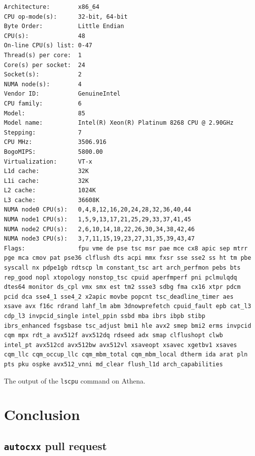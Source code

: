\begin{code}
    \begin{verbatim}
Architecture:        x86_64
CPU op-mode(s):      32-bit, 64-bit
Byte Order:          Little Endian
CPU(s):              48
On-line CPU(s) list: 0-47
Thread(s) per core:  1
Core(s) per socket:  24
Socket(s):           2
NUMA node(s):        4
Vendor ID:           GenuineIntel
CPU family:          6
Model:               85
Model name:          Intel(R) Xeon(R) Platinum 8268 CPU @ 2.90GHz
Stepping:            7
CPU MHz:             3506.916
BogoMIPS:            5800.00
Virtualization:      VT-x
L1d cache:           32K
L1i cache:           32K
L2 cache:            1024K
L3 cache:            36608K
NUMA node0 CPU(s):   0,4,8,12,16,20,24,28,32,36,40,44
NUMA node1 CPU(s):   1,5,9,13,17,21,25,29,33,37,41,45
NUMA node2 CPU(s):   2,6,10,14,18,22,26,30,34,38,42,46
NUMA node3 CPU(s):   3,7,11,15,19,23,27,31,35,39,43,47
Flags:               fpu vme de pse tsc msr pae mce cx8 apic sep mtrr pge mca cmov pat pse36 clflush dts acpi mmx fxsr sse sse2 ss ht tm pbe syscall nx pdpe1gb rdtscp lm constant_tsc art arch_perfmon pebs bts rep_good nopl xtopology nonstop_tsc cpuid aperfmperf pni pclmulqdq dtes64 monitor ds_cpl vmx smx est tm2 ssse3 sdbg fma cx16 xtpr pdcm pcid dca sse4_1 sse4_2 x2apic movbe popcnt tsc_deadline_timer aes xsave avx f16c rdrand lahf_lm abm 3dnowprefetch cpuid_fault epb cat_l3 cdp_l3 invpcid_single intel_ppin ssbd mba ibrs ibpb stibp ibrs_enhanced fsgsbase tsc_adjust bmi1 hle avx2 smep bmi2 erms invpcid cqm mpx rdt_a avx512f avx512dq rdseed adx smap clflushopt clwb intel_pt avx512cd avx512bw avx512vl xsaveopt xsavec xgetbv1 xsaves cqm_llc cqm_occup_llc cqm_mbm_total cqm_mbm_local dtherm ida arat pln pts pku ospke avx512_vnni md_clear flush_l1d arch_capabilities
    \end{verbatim}
    \caption{The output of the \texttt{lscpu} command on Athena.}
    \label{listing:avon-lscpu}
\end{code}


\chapter{Conclusion}
\label{ch:conclusion-appendix}

\section{\texttt{autocxx} pull request}
\label{sec:autocxx-pull-request-appendix}

